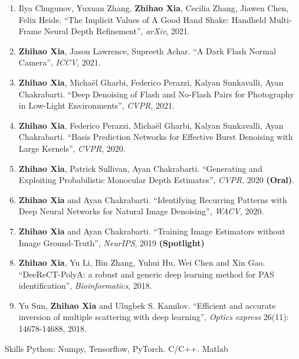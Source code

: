 \documentclass{resume} %
\newcommand{\B}[1]{\textbf{#1}}
\newcommand{\pub}[1]{\textrm{\textit{#1}}}
\begin{document}
\begin{enumerate}
  \item Ilya Chugunov, Yuxuan Zhang, \B{Zhihao Xia}, Cecilia Zhang, Jiawen Chen, Felix Heide. ``The Implicit Values of A Good Hand Shake: Handheld Multi-Frame Neural Depth Refinement'', \pub{arXiv}, 2021. \label{itemone}
  \item \B{Zhihao Xia}, Jason Lawrence, Supreeth Achar. ``A Dark Flash Normal Camera'', \pub{ICCV}, 2021.
  \item \B{Zhihao Xia}, Micha\"el Gharbi, Federico Perazzi, Kalyan Sunkavalli, Ayan Chakrabarti. ``Deep Denoising of Flash and No-Flash Pairs for Photography in Low-Light Environments'', \pub{CVPR}, 2021.
  \item \B{Zhihao Xia}, Federico Perazzi, Micha\"el Gharbi, Kalyan Sunkavalli, Ayan Chakrabarti. ``Basis Prediction Networks for Effective Burst Denoising with Large Kernels'', \pub{CVPR}, 2020.
  \item \B{Zhihao Xia}, Patrick Sullivan, Ayan Chakrabarti. ``Generating and Exploiting Probabilistic Monocular Depth Estimates'', \pub{CVPR}, 2020 \B{(Oral)}.
  \item \B{Zhihao Xia} and Ayan Chakrabarti. ``Identifying Recurring Patterns with Deep Neural Networks for Natural Image Denoising'', \pub{WACV}, 2020.
  \item \B{Zhihao Xia} and Ayan Chakrabarti. ``Training Image Estimators without Image Ground-Truth'', \pub{NeurIPS}, 2019 \B{(Spotlight)}
  \item \B{Zhihao Xia}, Yu Li, Bin Zhang, Yuhui Hu, Wei Chen and Xin Gao. ``DeeReCT-PolyA: a robust and generic deep learning method for PAS identification'', \pub{Bioinformatics}, 2018.
  \item Yu Sun, \B{Zhihao Xia} and Ulugbek S. Kamilov. ``Efficient and accurate inversion of multiple scattering with deep learning'', \pub{Optics express} 26(11): 14678-14688, 2018.
  \end{enumerate}



  \begin{rSection}{Skills}
  Python: Numpy, Tensorflow, PyTorch. C/C++. Matlab
  \end{rSection}
\end{document}

